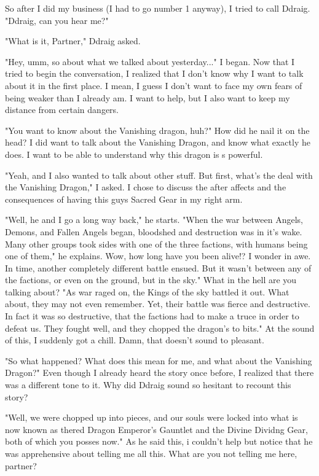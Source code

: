 \documentclass{article}
\begin{document}
So after I did my business (I had to go number 1 anyway), I tried to call Ddraig. "Ddraig, can you hear me?"

"What is it, Partner," Ddraig asked.

"Hey, umm, so about what we talked about yesterday..." I began. Now that I tried to begin the conversation, I realized that I don't know why I want to talk about it in the first place. I mean, I guess I don't want to face my own fears of being weaker than I already am. I want to help, but I also want to keep my distance from certain dangers.

"You want to know about the Vanishing dragon, huh?" How did he nail it on the head? I did want to talk about the Vanishing Dragon, and know what exactly he does. I want to be able to understand why this dragon is s powerful.

"Yeah, and I also wanted to talk about other stuff. But first, what's the deal with the Vanishing Dragon," I asked. I chose to discuss the after affects and the consequences of having this guys Sacred Gear in my right arm.

"Well, he and I go a long way back," he starts. "When the war between Angels, Demons, and Fallen Angels began, bloodshed and destruction was in it's wake. Many other groups took sides with one of the three factions, with humans being one of them," he explains. Wow, how long have you been alive!? I wonder in awe. In time, another completely different battle ensued. But it wasn't between any of the factions, or even on the ground, but in the sky." What in the hell are you talking about? "As war raged on, the Kings of the sky battled it out. What about, they may not even remember. Yet, their battle was fierce and destructive. In fact it was so destructive, that the factions had to make a truce in order to defeat us. They fought well, and they chopped the dragon's to bits." At the sound of this, I suddenly got a chill. Damn, that doesn't sound to pleasant.

"So what happened? What does this mean for me, and what about the Vanishing Dragon?" Even though I already heard the story once before, I realized that there was a different tone to it. Why did Ddraig sound so hesitant to recount this story?

"Well, we were chopped up into pieces, and our souls were locked into what is now known as thered Dragon Emperor's Gauntlet and the Divine Dividng Gear, both of which you posses now." As he said this, i couldn't help but notice that he was apprehensive about telling me all this. What are you not telling me here, partner?
\end{document}
